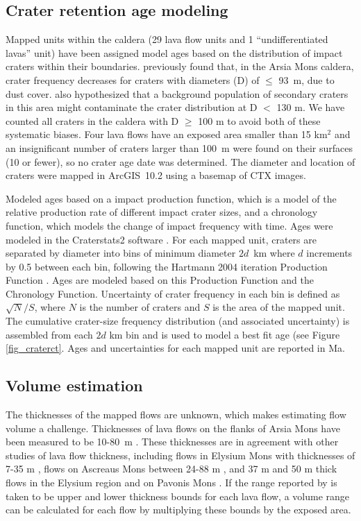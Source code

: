 \documentclass[12pt,letter]{article}
\begin{document}
\subsection{Crater retention age modeling}

Mapped units within the caldera (29 lava flow units and 1 ``undifferentiated lavas'' unit) have been assigned model ages based on the distribution of impact craters within their boundaries. \citet{robbins2011volcanic} previously found that, in the Arsia Mons caldera, crater frequency decreases for craters with diameters (D) of $\le$ 93~m, due to dust cover. \citet{robbins2011volcanic} also hypothesized that a background population of secondary craters in this area might contaminate the crater distribution at D $<$ 130 m. We have counted all craters in the caldera with D $\ge$ 100 m to avoid both of these systematic biases. Four lava flows have an exposed area smaller than 15 km$^2$ and an insignificant number of craters larger than 100~m were found on their surfaces (10 or fewer), so no crater age date was determined. The diameter and location of craters were mapped in ArcGIS~10.2 using a basemap of CTX images.

Modeled ages based on a impact production function, which is a model of the relative production rate of different impact crater sizes, and a chronology function, which models the change of impact frequency with time. Ages were modeled in the Craterstats2 software \citep{michael2013planetary}. For each mapped unit, craters are separated by diameter into bins of minimum diameter $2d$~km where $d$ increments by 0.5 between each bin, following the Hartmann 2004 iteration Production Function \citep{hartmann2005martian}. Ages are modeled based on this Production Function and the \citet{michael2013planetary} Chronology Function. Uncertainty of crater frequency in each bin is defined as $\sqrt{N}/S$, where $N$ is the number of craters and $S$ is the area of the mapped unit. The cumulative crater-size frequency distribution (and associated uncertainty) is assembled from each $2d$ km bin and is used to model a best fit age (see Figure \ref{fig_craterct}. Ages and uncertainties for each mapped unit are reported in Ma.

\subsection{Volume estimation}\label{sec_volume}

The thicknesses of the mapped flows are unknown, which makes estimating flow volume a challenge. Thicknesses of lava flows on the flanks of Arsia Mons have been measured to be 10-80~m \citep{mouginis2008lava}. These thicknesses are in agreement with other studies of lava flow thickness, including flows in Elysium Mons with thicknesses of 7-35 m \citep{pasckert2012rheologies}, flows on Ascreaus Mons between 24-88 m \citep{hiesinger2007young}, and 37 m and 50 m thick flows in the Elysium region and on Pavonis Mons \citep{glaze2003methodology,baloga2003rheology}. If the range reported by \citet{mouginis2008lava} is taken to be upper and lower thickness bounds for each lava flow, a volume range can be calculated for each flow by multiplying these bounds by the exposed area.
\end{document}
